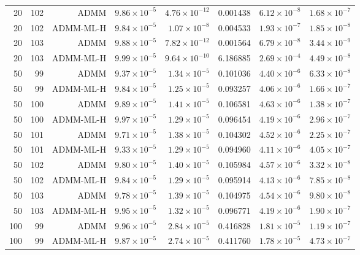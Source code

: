 \documentclass[preprint,12pt,3p]{elsarticle}
\theoremstyle{definition}
\begin{document}
\begin{longtable}{rrrrrrrr}
\midrule
20 & 102 & ADMM & $9.86\times 10^{-5}$ & $4.76\times 10^{-12}$ & 0.001438 & $6.12\times 10^{-8}$ & $1.68\times 10^{-7}$ \\
20 & 102 & ADMM-ML-H & $9.84\times 10^{-5}$ & $1.07\times 10^{-8}$ & 0.004533 & $1.93\times 10^{-7}$ & $1.85\times 10^{-8}$ \\
\midrule
20 & 103 & ADMM & $9.88\times 10^{-5}$ & $7.82\times 10^{-12}$ & 0.001564 & $6.79\times 10^{-8}$ & $3.44\times 10^{-9}$ \\
20 & 103 & ADMM-ML-H & $9.99\times 10^{-5}$ & $9.64\times 10^{-10}$ & 6.186885 & $2.69\times 10^{-4}$ & $4.49\times 10^{-8}$ \\
\midrule
50 & 99 & ADMM & $9.37\times 10^{-5}$ & $1.34\times 10^{-5}$ & 0.101036 & $4.40\times 10^{-6}$ & $6.33\times 10^{-8}$ \\
50 & 99 & ADMM-ML-H & $9.84\times 10^{-5}$ & $1.25\times 10^{-5}$ & 0.093257 & $4.06\times 10^{-6}$ & $1.66\times 10^{-7}$ \\
\midrule
50 & 100 & ADMM & $9.89\times 10^{-5}$ & $1.41\times 10^{-5}$ & 0.106581 & $4.63\times 10^{-6}$ & $1.38\times 10^{-7}$ \\
50 & 100 & ADMM-ML-H & $9.97\times 10^{-5}$ & $1.29\times 10^{-5}$ & 0.096454 & $4.19\times 10^{-6}$ & $2.96\times 10^{-7}$ \\
\midrule
50 & 101 & ADMM & $9.71\times 10^{-5}$ & $1.38\times 10^{-5}$ & 0.104302 & $4.52\times 10^{-6}$ & $2.25\times 10^{-7}$ \\
50 & 101 & ADMM-ML-H & $9.33\times 10^{-5}$ & $1.29\times 10^{-5}$ & 0.094960 & $4.11\times 10^{-6}$ & $4.05\times 10^{-7}$ \\
\midrule
50 & 102 & ADMM & $9.80\times 10^{-5}$ & $1.40\times 10^{-5}$ & 0.105984 & $4.57\times 10^{-6}$ & $3.32\times 10^{-8}$ \\
50 & 102 & ADMM-ML-H & $9.84\times 10^{-5}$ & $1.29\times 10^{-5}$ & 0.095914 & $4.13\times 10^{-6}$ & $7.85\times 10^{-8}$ \\
\midrule
50 & 103 & ADMM & $9.78\times 10^{-5}$ & $1.39\times 10^{-5}$ & 0.104975 & $4.54\times 10^{-6}$ & $9.80\times 10^{-8}$ \\
50 & 103 & ADMM-ML-H & $9.95\times 10^{-5}$ & $1.32\times 10^{-5}$ & 0.096771 & $4.19\times 10^{-6}$ & $1.90\times 10^{-7}$ \\
\midrule
100 & 99 & ADMM & $9.96\times 10^{-5}$ & $2.84\times 10^{-5}$ & 0.416828 & $1.81\times 10^{-5}$ & $1.19\times 10^{-7}$ \\
100 & 99 & ADMM-ML-H & $9.87\times 10^{-5}$ & $2.74\times 10^{-5}$ & 0.411760 & $1.78\times 10^{-5}$ & $4.73\times 10^{-7}$ \\

\end{longtable}
\end{document}
